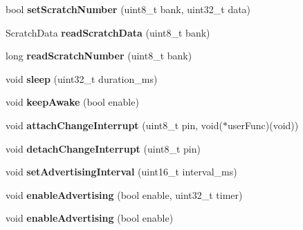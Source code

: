 \begin{DoxyCompactItemize}
\item 
\hypertarget{class_bean_class_a74e7107c64bec91d676cdd534ac6bb4d}{}bool {\bfseries set\+Scratch\+Number} (uint8\+\_\+t bank, uint32\+\_\+t data)\label{class_bean_class_a74e7107c64bec91d676cdd534ac6bb4d}

\item 
\hypertarget{class_bean_class_af5b9029cc816e5ce21263be975aa6050}{}Scratch\+Data {\bfseries read\+Scratch\+Data} (uint8\+\_\+t bank)\label{class_bean_class_af5b9029cc816e5ce21263be975aa6050}

\item 
\hypertarget{class_bean_class_a4c835abe680607ce956af4f7fa965a20}{}long {\bfseries read\+Scratch\+Number} (uint8\+\_\+t bank)\label{class_bean_class_a4c835abe680607ce956af4f7fa965a20}

\item 
\hypertarget{class_bean_class_a15d6716d0bdc66a0345acc29d0c14a14}{}void {\bfseries sleep} (uint32\+\_\+t duration\+\_\+ms)\label{class_bean_class_a15d6716d0bdc66a0345acc29d0c14a14}

\item 
\hypertarget{class_bean_class_abbd5ae43b98270dfc94b98b2ecd66281}{}void {\bfseries keep\+Awake} (bool enable)\label{class_bean_class_abbd5ae43b98270dfc94b98b2ecd66281}

\item 
\hypertarget{class_bean_class_aa1920bbc73b1222e46a47c92c4cef3f5}{}void {\bfseries attach\+Change\+Interrupt} (uint8\+\_\+t pin, void($\ast$user\+Func)(void))\label{class_bean_class_aa1920bbc73b1222e46a47c92c4cef3f5}

\item 
\hypertarget{class_bean_class_a3ab4cad77594ec3fa54d605b097ba2ff}{}void {\bfseries detach\+Change\+Interrupt} (uint8\+\_\+t pin)\label{class_bean_class_a3ab4cad77594ec3fa54d605b097ba2ff}

\item 
\hypertarget{class_bean_class_a41412684c0f01f06f260fb1e724475d9}{}void {\bfseries set\+Advertising\+Interval} (uint16\+\_\+t interval\+\_\+ms)\label{class_bean_class_a41412684c0f01f06f260fb1e724475d9}

\item 
\hypertarget{class_bean_class_a9bff2d903c4a543ba48f0ac1b392c7cc}{}void {\bfseries enable\+Advertising} (bool enable, uint32\+\_\+t timer)\label{class_bean_class_a9bff2d903c4a543ba48f0ac1b392c7cc}

\item 
\hypertarget{class_bean_class_ade5d4c6a061eeb6d7897ef4c3b2c26d3}{}void {\bfseries enable\+Advertising} (bool enable)\label{class_bean_class_ade5d4c6a061eeb6d7897ef4c3b2c26d3}


\end{DoxyCompactItemize}
